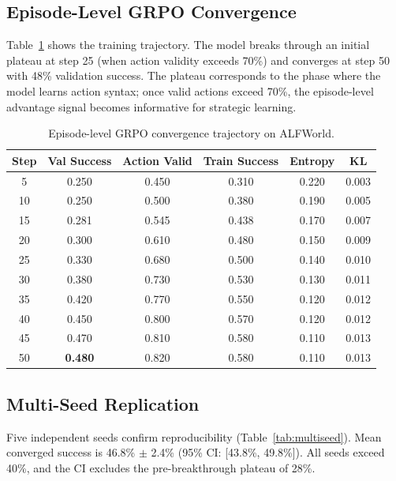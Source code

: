 \documentclass[11pt]{article}
\begin{document}
\subsection{Episode-Level GRPO Convergence}

Table~\ref{tab:convergence} shows the training trajectory. The model breaks through an initial plateau at step 25 (when action validity exceeds 70\%) and converges at step 50 with 48\% validation success. The plateau corresponds to the phase where the model learns action syntax; once valid actions exceed 70\%, the episode-level advantage signal becomes informative for strategic learning.

\begin{table}[h]
\centering
\caption{Episode-level GRPO convergence trajectory on ALFWorld.}
\label{tab:convergence}
\begin{tabular}{cccccc}
\toprule
Step & Val Success & Action Valid & Train Success & Entropy & KL \\
\midrule
5  & 0.250 & 0.450 & 0.310 & 0.220 & 0.003 \\
10 & 0.250 & 0.500 & 0.380 & 0.190 & 0.005 \\
15 & 0.281 & 0.545 & 0.438 & 0.170 & 0.007 \\
20 & 0.300 & 0.610 & 0.480 & 0.150 & 0.009 \\
25 & 0.330 & 0.680 & 0.500 & 0.140 & 0.010 \\
30 & 0.380 & 0.730 & 0.530 & 0.130 & 0.011 \\
35 & 0.420 & 0.770 & 0.550 & 0.120 & 0.012 \\
40 & 0.450 & 0.800 & 0.570 & 0.120 & 0.012 \\
45 & 0.470 & 0.810 & 0.580 & 0.110 & 0.013 \\
50 & \textbf{0.480} & 0.820 & 0.580 & 0.110 & 0.013 \\
\bottomrule
\end{tabular}
\end{table}

\subsection{Multi-Seed Replication}

Five independent seeds confirm reproducibility (Table~\ref{tab:multiseed}). Mean converged success is 46.8\% $\pm$ 2.4\% (95\% CI: [43.8\%, 49.8\%]). All seeds exceed 40\%, and the CI excludes the pre-breakthrough plateau of 28\%.
\end{document}
